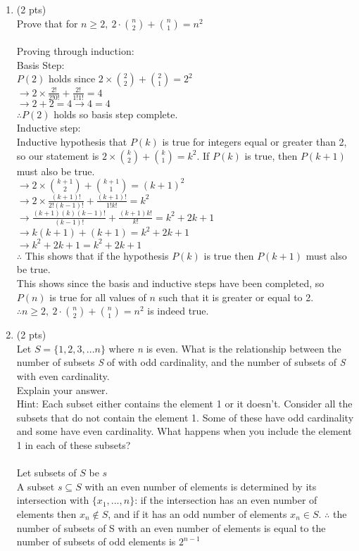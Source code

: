 \documentclass[12pt]{article}
\begin{document}
\begin{enumerate}
\item (2 pts) \\
	Prove that for \(n \geq 2,   \ 2 \cdot \binom{n}{2} + \binom{n}{1}=n^{2}\)\\
    \\Proving through induction:
    \\Basis Step:
    \\$P(2)$ holds since $2 \times \binom{2}{2} + \binom{2}{1} = 2^2$
    \\$\rightarrow 2 \times \frac{2!}{2!0!} + \frac{2!}{1!1!} = 4$
    \\$\rightarrow 2 + 2 = 4 \rightarrow 4 = 4$
    \\$\therefore P(2)$ holds so basis step complete.
    \\Inductive step:
    \\Inductive hypothesis that $P(k)$ is true for integers equal or greater than 2, so our statement is $2 \times \binom{k}{2} + \binom{k}{1} = k^2$. If $P(k)$ is true, then $P(k+1)$ must also be true.
    \\$\rightarrow 2 \times \binom{k+1}{2} + \binom{k+1}{1} = (k+1)^2$
    \\$\rightarrow 2 \times \frac{(k+1)!}{2!(k-1)!} + \frac{(k+1)!}{1!k!} = k^2$
    \\$\rightarrow \frac{(k+1)(k)(k-1)!}{(k-1)!} + \frac{(k+1)k!}{k!} = k^2 + 2k + 1$
    \\$\rightarrow k(k+1) + (k+ 1) = k^2 + 2k + 1$
    \\$\rightarrow k^2 + 2k + 1 = k^2 + 2k + 1$
    \\$\therefore$ This shows that if the hypothesis $P(k)$ is true then $P(k+1)$ must also be true.
    \\This shows since the basis and inductive steps have been completed, so $P(n)$ is true for all values of $n$ such that it is greater or equal to 2. $\therefore n \geq 2,   \ 2 \cdot \binom{n}{2} + \binom{n}{1}=n^{2}$ is indeed true.


\item (2 pts)\\
Let \(S = \lbrace1,2,3,...n\rbrace\) where {\it  n }  is even. What is the relationship between the number of subsets {\it  S }  of with odd cardinality, and the number of subsets of {\it  S }  with even cardinality. \\
Explain your answer.
\leavevmode\\\relax
Hint: Each subset either contains the element 1 or it doesn't. Consider all the subsets that do not contain the element 1. Some of these have odd cardinality and some have even cardinality. What happens when you include the element 1 in each of these subsets?\\
\\Let subsets of $S$ be $s$
\\A subset $s \subseteq S$ with an even number of elements is determined by its intersection with $\{x_1,...,n\}$: if the intersection has an even number of elements then $x_n \notin S$, and if it has an odd number of elements $x_n \in S$. $\therefore$ the number of subsets of S with an even number of elements is equal to the number of subsets of odd elements is $2^{n-1}$





\end{enumerate}
\end{document}
